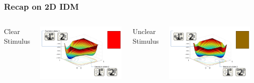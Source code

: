\documentclass[xcolor={fixpdftex,hyperref,x11names},10pt,pdftex,hyperref={pdftex}]{beamer}
\begin{document}
\begin{frame}
    \frametitle{Recap on 2D IDM}

\begin{columns}
        Clear Stimulus
    \begin{center}
        \includegraphics[width=0.99\textwidth]{figs/clear-stim.png}
    \end{center}

        Unclear Stimulus
            \begin{center}
            \includegraphics[width=0.99\textwidth]{figs/unclear-stim.png}
        \end{center}

\end{columns}

\end{frame}

\end{document}
